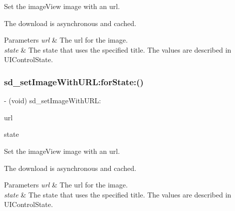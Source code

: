 Set the image\+View {\ttfamily image} with an {\ttfamily url}.

The download is asynchronous and cached.


\begin{DoxyParams}{Parameters}
{\em url} & The url for the image. \\
\hline
{\em state} & The state that uses the specified title. The values are described in U\+I\+Control\+State. \\
\hline
\end{DoxyParams}
\mbox{\label{category_u_i_button_07_web_cache_08_ae6bef75306491d9a3131b5fed0f86d88}} 
\subsubsection{\texorpdfstring{sd\+\_\+set\+Image\+With\+U\+R\+L\+:for\+State\+:()}{sd\_setImageWithURL:forState:()}\hspace{0.1cm}{\footnotesize\ttfamily [2/3]}}
{\footnotesize\ttfamily -\/ (void) sd\+\_\+set\+Image\+With\+U\+R\+L\+: \begin{DoxyParamCaption}\item[{(N\+S\+U\+RL $\ast$)}]{url }\item[{forState:(U\+I\+Control\+State)}]{state }\end{DoxyParamCaption}}

Set the image\+View {\ttfamily image} with an {\ttfamily url}.

The download is asynchronous and cached.


\begin{DoxyParams}{Parameters}
{\em url} & The url for the image. \\
\hline
{\em state} & The state that uses the specified title. The values are described in U\+I\+Control\+State. \\
\hline
\end{DoxyParams}
\mbox{\label{category_u_i_button_07_web_cache_08_ae6bef75306491d9a3131b5fed0f86d88}} 
